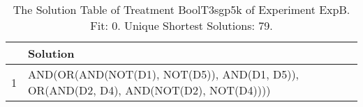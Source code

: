\begin{table}[ht]
\centering
\begin{tabular}{rp{9cm}}
  \hline
 & Solution \\ 
  \hline
1 & AND(OR(AND(NOT(D1), NOT(D5)), AND(D1, D5)), OR(AND(D2, D4), AND(NOT(D2), NOT(D4)))) \\ 
   \hline
\end{tabular}
\caption{The Solution Table of Treatment BoolT3sgp5k of Experiment ExpB. Fit: 0. Unique Shortest Solutions: 79.} 
\end{table}

